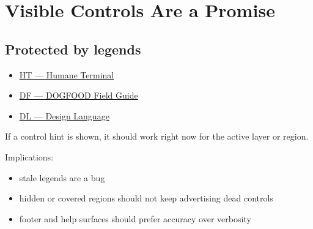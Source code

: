 \chapter{Visible Controls Are a Promise}\label{record-063}

\smallskip

\section{Protected by legends}\label{record-063-protected-by-legends}

\begin{itemize}
\tightlist
\item
  \href{https://github.com/flyingrobots/bijou/blob/1853ad902f6bf219326409e7f743a5a1d6517dbc/docs/legends/HT-humane-terminal.md}{HT --- Humane Terminal}
\item
  \href{https://github.com/flyingrobots/bijou/blob/1853ad902f6bf219326409e7f743a5a1d6517dbc/docs/legends/DF-dogfood-field-guide.md}{DF --- DOGFOOD Field Guide}
\item
  \href{https://github.com/flyingrobots/bijou/blob/1853ad902f6bf219326409e7f743a5a1d6517dbc/docs/legends/DL-design-language.md}{DL --- Design Language}
\end{itemize}

If a control hint is shown, it should work right now for the active layer or region.

Implications:

\begin{itemize}
\tightlist
\item
  stale legends are a bug
\item
  hidden or covered regions should not keep advertising dead controls
\item
  footer and help surfaces should prefer accuracy over verbosity
\end{itemize}

